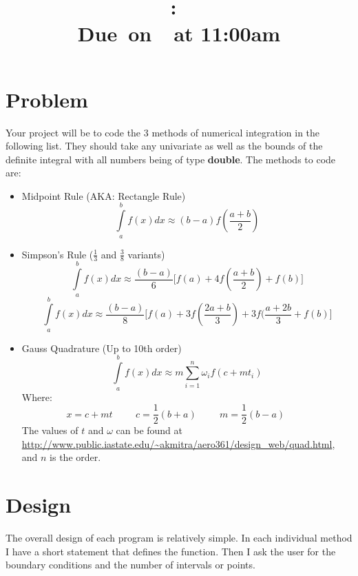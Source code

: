 \documentclass{article}
\title{
    \vspace{2in}
    \textmd{\textbf{\hmwkClass:\ \hmwkTitle}}\\
    \normalsize\vspace{0.1in}\small{Due\ on\ \hmwkDueDate\ at 11:00am}\\
    \vspace{0.1in}\large{\textit{\hmwkClassInstructor}}
    \vspace{3in}
}
\author{\hmwkAuthorName}
\date{}
\begin{document}
\maketitle
\pagebreak

\section{Problem}
Your project will be to code the 3 methods of numerical integration in the following list. They
should take any univariate as well as the bounds of the definite integral with all numbers
being of type \textbf{double}. The methods to code are:
\begin{itemize}
\item Midpoint Rule (AKA: Rectangle Rule)\\
\begin{equation}
    \int\limits_a^b f(x)dx\approx (b-a)f(\frac{a+b}{2})
\end{equation}
\item Simpson's Rule (\( \frac{1}{3} \) and \( \frac{3}{8} \) variants)
\begin{equation}
        \int\limits_a^b f(x)dx\approx\frac{(b-a)}{6}\bigg[f(a)+4f(\frac{a+b}{2})+f(b)\bigg]
\end{equation}
\begin{equation}
    \int\limits_a^b f(x)dx\approx\frac{(b-a)}{8}\bigg[f(a)+3f(\frac{2a+b}{3})+3f(\frac{a+2b}{3}+f(b)\bigg]
\end{equation}
\item Gauss Quadrature (Up to 10th order)
\begin{equation}
    \int\limits_a^b f(x)dx\approx m\sum_{i=1}^{n} \omega_i f(c+mt_i)
\end{equation}
Where:
\begin{equation}
    x=c+mt \hspace{1cm} c=\frac{1}{2}(b+a) \hspace{1cm} m=\frac{1}{2}(b-a) \hspace{1cm}
\end{equation}
The values of \( t \) and \( \omega \) can be found at \url{http://www.public.iastate.edu/~akmitra/aero361/design_web/quad.html}, and \( n\) is the order.
\end{itemize}

\section{Design}
The overall design of each program is relatively simple.
In each individual method I have a short statement that defines the function.
Then I ask the user for the boundary conditions and the number of intervals or points. 
\end{document}
